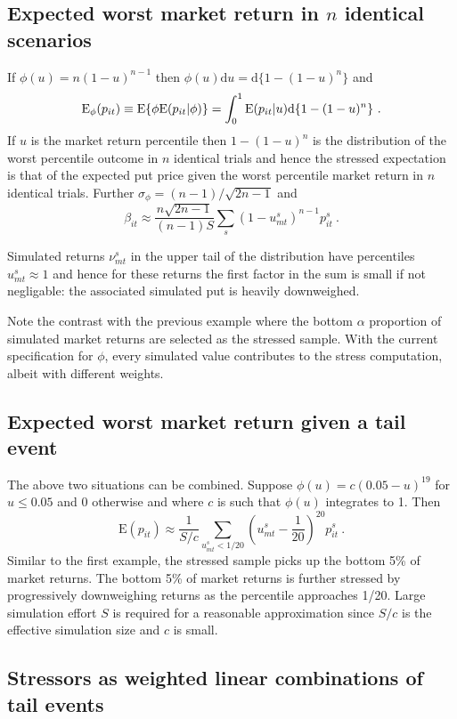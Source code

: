 \documentclass[authoryear]{elsarticle}
\newcommand{\E}{\mathrm{E}}
\newcommand{\de}{\mathrm{d}}
\begin{document}
\subsection{Expected worst market return in $n$ identical scenarios} 
If $\phi(u)=n(1-u)^{n-1}$ then $\phi(u)\de u = \de\{1-(1-u)^n\}$ and 
$$
\Es(p_{it}) \equiv \E\{\phi\E(p_{it}|\phi)\} = \int_0^1\E(p_{it}|u)\de\{1-(1-u)^n\}\ .
$$
If $u$ is the market return percentile then  $1-(1-u)^n$ is the distribution of the worst percentile outcome in $n$ identical trials and hence the stressed expectation is that of the expected put price given the worst percentile market return in $n$ identical trials.  Further 
 $\sigma_\phi=(n-1)/\sqrt{2n-1}$ and 
$$
\beta_{it}  \approx \frac{n\sqrt{2n-1}}{(n-1)S} \sum_s (1-u^s_{mt})^{n-1}p_{it}^s \ . 
$$

Simulated returns $\nu^s_{mt}$ in the upper tail of the distribution  have percentiles $u^s_{mt}\approx 1$ and hence for these returns the first factor in the sum is  small if not negligable: the associated simulated put  is heavily downweighed.

Note the contrast with the previous example where the bottom $\alpha$ proportion of simulated market returns are selected as the stressed sample. With the current specification for $\phi$,   every simulated value contributes to the stress computation, albeit with  different weights.


\subsection{Expected worst market return given a tail event}

The above two situations can be combined.   Suppose  $\phi(u)=c(0.05-u)^{19}$ for $u\le 0.05$ and 0 otherwise and where $c$ is such that $\phi(u)$ integrates to 1.  Then
$$
\E(p_{it}) \approx \frac{1}{S/c}\sum_{u^s_{mt}<1/20}  \left(u^s_{mt}-\frac{1}{20}\right)^{20}p_{it}^s\ .
$$
 Similar to the first example, the stressed sample picks up the bottom 5\% of market returns. The bottom 5\% of market returns is further stressed by  progressively downweighing returns as the percentile approaches 1/20.   Large simulation effort $S$ is required for a reasonable approximation since $S/c$ is the effective simulation size and $c$ is small.
 
 \subsection{Stressors as  weighted linear combinations of tail events}
\end{document}
